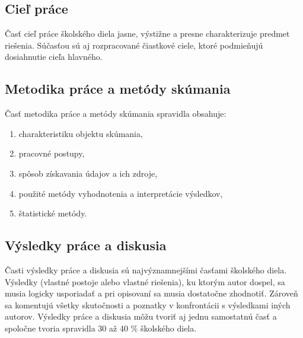 \subsection{Cieľ práce}
Časť cieľ práce  školského diela jasne, výstižne a presne charakterizuje predmet
riešenia. Súčasťou sú aj rozpracované čiastkové ciele, ktoré podmieňujú dosiahnutie
cieľa hlavného.

\subsection{Metodika práce a metódy skúmania}
Časť metodika práce a metódy skúmania spravidla obsahuje:
\begin{enumerate}
    \item  charakteristiku objektu skúmania,
    \item  pracovné postupy,
    \item  spôsob získavania údajov a ich zdroje,
    \item  použité metódy vyhodnotenia a interpretácie výsledkov,
    \item  štatistické metódy.
\end{enumerate}

\subsection{Výsledky práce a diskusia}
Časti výsledky práce a diskusia sú najvýznamnejšími  časťami  školského diela.
Výsledky (vlastné postoje alebo vlastné riešenia), ku ktorým autor dospel, sa musia
logicky usporiadať a pri opisovaní sa musia dostatočne zhodnotiť. Zároveň sa
komentujú všetky skutočnosti a poznatky v konfrontácii s výsledkami iných autorov.
Výsledky práce a diskusia môžu tvoriť aj jednu samostatnú časť  a spoločne tvoria
spravidla 30 až 40 \% školského diela.

